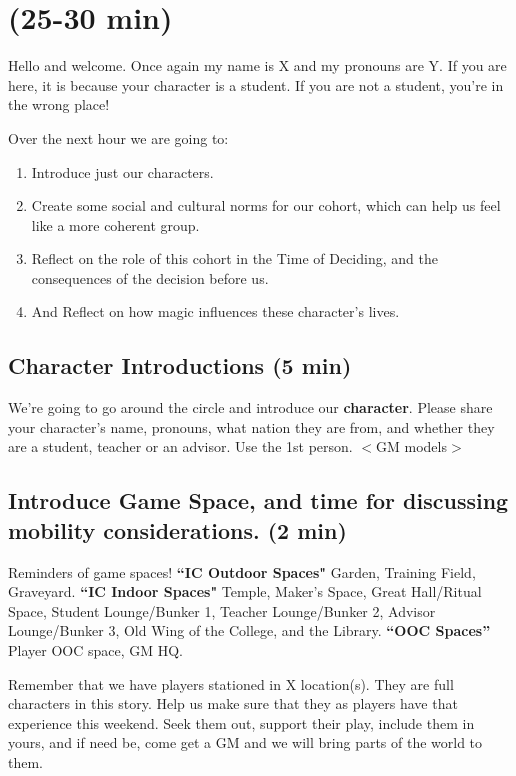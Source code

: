 \documentclass[green]{GL2020}
\begin{document}
\name{\gPreGameStudent{}}

\section*{(25-30 min)}

Hello and welcome. Once again my name is X and my pronouns are Y. If you are here, it is because your character is a student. If you are not a student, you're in the wrong place!

Over the next hour we are going to:
\begin{enumerate}
	\item Introduce just our characters.
	\item Create some social and cultural norms for our cohort, which can help us feel like a more coherent group.
	\item Reflect on the role of this cohort in the Time of Deciding, and the consequences of the decision before us.
	\item And Reflect on how magic influences these character’s lives.
\end{enumerate}

\subsection*{Character Introductions (5 min)}
We’re going to go around the circle and introduce our \textbf{character}. Please share your character’s name, pronouns, what nation they are from, and whether they are a student, teacher or an advisor. Use the 1st person. $<$GM models$>$

\subsection*{Introduce Game Space, and time for discussing mobility considerations. (2 min)}
Reminders of game spaces!
\textbf{``IC Outdoor Spaces"} Garden, Training Field, Graveyard. 
\textbf{``IC Indoor Spaces"} Temple, Maker's Space, Great Hall/Ritual Space, Student Lounge/Bunker 1, Teacher Lounge/Bunker 2, Advisor Lounge/Bunker 3, Old Wing of the College, and the Library.
\textbf{``OOC Spaces''} Player OOC space, GM HQ.

Remember that we have players stationed in X location(s). They are full characters in this story. Help us make sure that they as players have that experience this weekend. Seek them out, support their play, include them in yours, and if need be, come get a GM and we will bring parts of the world to them.
\end{document}
